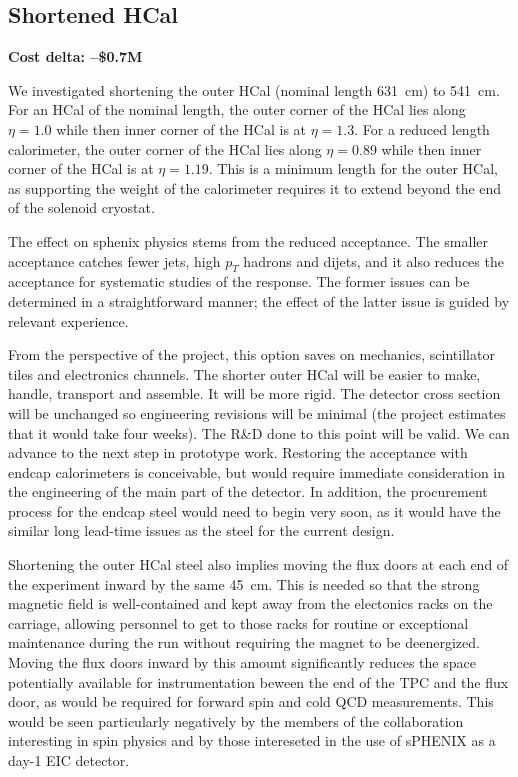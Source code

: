\subsection{Shortened HCal}
\label{ohcal_short}

\textbf{Cost delta: --\$0.7M}
 
We investigated shortening the outer HCal (nominal length 631~cm) to
541~cm.  For an HCal of the nominal length, the outer corner of the
HCal lies along $\eta = 1.0$ while then inner corner of the HCal is at
$\eta = 1.3$.  For a reduced length calorimeter, the outer corner of
the HCal lies along $\eta = 0.89$ while then inner corner of the HCal
is at $\eta = 1.19$.  This is a minimum length for the outer HCal, as
supporting the weight of the calorimeter requires it to extend beyond
the end of the solenoid cryostat.

The effect on sphenix physics stems from the reduced acceptance.  The
smaller acceptance catches fewer jets, high $p_T$ hadrons and dijets,
and it also reduces the acceptance for systematic studies of the
response.  The former issues can be determined in a straightforward
manner; the effect of the latter issue is guided by relevant
experience.

From the perspective of the project, this option saves on mechanics,
scintillator tiles and electronics channels.  The shorter outer HCal
will be easier to make, handle, transport and assemble.  It will be
more rigid.  The detector cross section will be unchanged so
engineering revisions will be minimal (the project estimates that it
would take four weeks). The R\&D done to this point will be valid.  We
can advance to the next step in prototype work.  Restoring the
acceptance with endcap calorimeters is conceivable, but would require
immediate consideration in the engineering of the main part of the
detector.  In addition, the procurement process for the endcap steel
would need to begin very soon, as it would have the similar long
lead-time issues as the steel for the current design.

Shortening the outer HCal steel also implies moving the flux doors at
each end of the experiment inward by the same 45~cm.  This is needed
so that the strong magnetic field is well-contained and kept away from
the electonics racks on the carriage, allowing personnel to get to
those racks for routine or exceptional maintenance during the run
without requiring the magnet to be deenergized.  Moving the flux doors
inward by this amount significantly reduces the space potentially
available for instrumentation beween the end of the TPC and the flux
door, as would be required for forward spin and cold QCD measurements.
This would be seen particularly negatively by the members of the
collaboration interesting in spin physics and by those intereseted in
the use of sPHENIX as a day-1 EIC detector.
